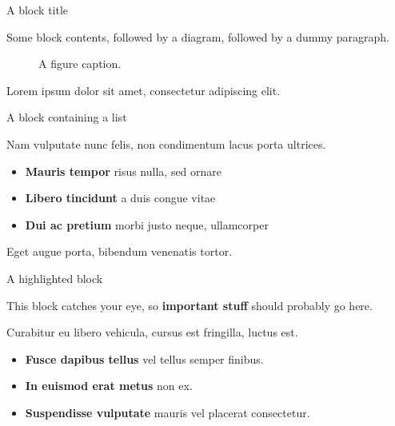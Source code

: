 \documentclass[final]{beamer}
\newlength{\sepwidth}
\newlength{\colwidth}
\newcommand{\separatorcolumn}{\begin{column}{\sepwidth}\end{column}}
\begin{document}
\begin{frame}[t]
\begin{columns}[t]
\separatorcolumn

\begin{column}{\colwidth}

  \begin{block}{A block title}

    Some block contents, followed by a diagram, followed by a dummy paragraph.

    \begin{figure}
      \centering
      \caption{A figure caption.}
    \end{figure}

    Lorem ipsum dolor sit amet, consectetur adipiscing elit.
    \cite{shannon1948communication} %

  \end{block}

  \begin{block}{A block containing a list}

    Nam vulputate nunc felis, non condimentum lacus porta ultrices. 

    \begin{itemize}
      \item \textbf{Mauris tempor} risus nulla, sed ornare
      \item \textbf{Libero tincidunt} a duis congue vitae
      \item \textbf{Dui ac pretium} morbi justo neque, ullamcorper
    \end{itemize}

    Eget augue porta, bibendum venenatis tortor.

  \end{block}

  \begin{alertblock}{A highlighted block}

    This block catches your eye, so \textbf{important stuff} should probably go
    here.

    Curabitur eu libero vehicula, cursus est fringilla, luctus est.

    \begin{itemize}
      \item \textbf{Fusce dapibus tellus} vel tellus semper finibus. 
      \item \textbf{In euismod erat metus} non ex. 
      \item \textbf{Suspendisse vulputate} mauris vel placerat consectetur.
        

\end{itemize}
\end{alertblock}
\end{column}
\end{columns}
\end{frame}
\end{document}
